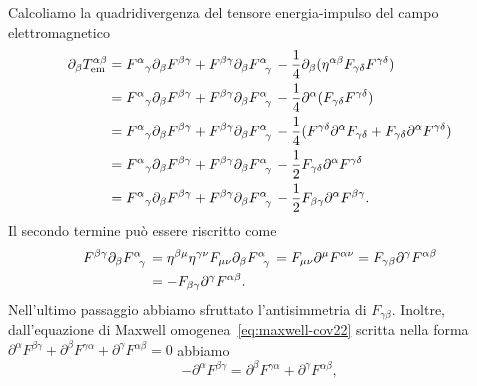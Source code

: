 Calcoliamo la quadridivergenza del tensore energia-impulso del campo
elettromagnetico
\begin{equation}
  \begin{split}
    \partial_{\beta}T_{\textup{em}}^{\alpha\beta} &=
    \tensor{F}{^{\alpha}}_{\gamma}\partial_{\beta}F^{\beta\gamma} +
    F^{\beta\gamma}\partial_{\beta}\tensor{F}{^{\alpha}_{\gamma}} -
    \frac{1}{4} \partial_{\beta}
    (\eta^{\alpha\beta}F_{\gamma\delta}F^{\gamma\delta}) \\
    &= \tensor{F}{^{\alpha}}_{\gamma}\partial_{\beta}F^{\beta\gamma} +
    F^{\beta\gamma}\partial_{\beta}\tensor{F}{^{\alpha}_{\gamma}} -
    \frac{1}{4} \partial^{\alpha}(F_{\gamma\delta}F^{\gamma\delta}) \\
    &= \tensor{F}{^{\alpha}}_{\gamma}\partial_{\beta}F^{\beta\gamma} +
    F^{\beta\gamma}\partial_{\beta}\tensor{F}{^{\alpha}_{\gamma}} -
    \frac{1}{4}(F^{\gamma\delta}\partial^{\alpha}F_{\gamma\delta} +
    F_{\gamma\delta}\partial^{\alpha}F^{\gamma\delta}) \\
    &= \tensor{F}{^{\alpha}}_{\gamma}\partial_{\beta}F^{\beta\gamma} +
    F^{\beta\gamma}\partial_{\beta}\tensor{F}{^{\alpha}_{\gamma}} -
    \frac{1}{2}F_{\gamma\delta}\partial^{\alpha}F^{\gamma\delta} \\
    &= \tensor{F}{^{\alpha}}_{\gamma}\partial_{\beta}F^{\beta\gamma} +
    F^{\beta\gamma}\partial_{\beta}\tensor{F}{^{\alpha}_{\gamma}} -
    \frac{1}{2}F_{\beta\gamma}\partial^{\alpha}F^{\beta\gamma}.
  \end{split}
\end{equation}
Il secondo termine può essere riscritto come
\begin{equation}
  \begin{split}
    F^{\beta\gamma}\partial_{\beta}\tensor{F}{^{\alpha}_{\gamma}} &=
    \eta^{\beta\mu}\eta^{\gamma\nu}F_{\mu\nu} \partial_{\beta}
    \tensor{F}{^{\alpha}_{\gamma}} = F_{\mu\nu} \partial^{\mu} F^{\alpha\nu} =
    F_{\gamma\beta} \partial^{\gamma} F^{\alpha\beta} \\
    &= -F_{\beta\gamma} \partial^{\gamma} F^{\alpha\beta}.
  \end{split}
\end{equation}
Nell'ultimo passaggio abbiamo sfruttato l'antisimmetria di $F_{\gamma\beta}$.
Inoltre, dall'equazione di Maxwell omogenea~\eqref{eq:maxwell-cov22} scritta
nella forma
$\partial^{\alpha}F^{\beta\gamma} + \partial^{\beta}F^{\gamma\alpha}
+ \partial^{\gamma}F^{\alpha\beta} = 0$ abbiamo
\begin{equation}
  -\partial^{\alpha}F^{\beta\gamma} = \partial^{\beta}F^{\gamma\alpha}
  + \partial^{\gamma}F^{\alpha\beta},
\end{equation}
